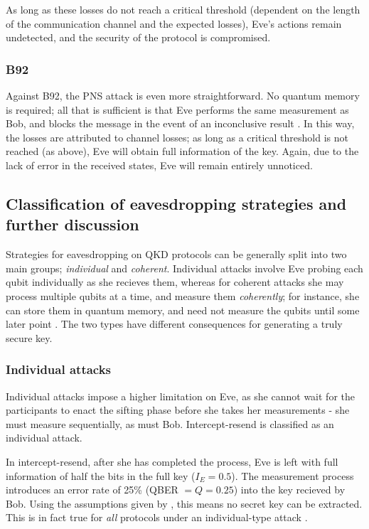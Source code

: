 \documentclass[paper=a4, fontsize=11pt]{scrartcl} %
\numberwithin{equation}{section} %
\numberwithin{figure}{section} %
\numberwithin{table}{section} %
\begin{document}
As long as these losses do not reach a critical threshold (dependent on the length of the communication channel and the expected losses),
Eve's actions remain undetected, and the security of the protocol is compromised.


\subsubsection{B92}
Against B92, the PNS attack is even more straightforward. No quantum memory is required; all that is sufficient is that Eve performs
the same measurement as Bob, and blocks the message in the event of an inconclusive result \citep{kronberg2009}. In this way, the losses are attributed
to channel losses; as long as a critical threshold is not reached (as above), Eve will obtain full information of the key. Again, due to
the lack of error in the received states, Eve will remain entirely unnoticed.

\subsection{Classification of eavesdropping strategies and further discussion}
Strategies for eavesdropping on QKD protocols can be generally split into two main groups;
\textit{individual} and \textit{coherent}. Individual attacks involve
Eve probing each qubit individually as she recieves them, whereas for coherent attacks
she may process multiple qubits at a time, and measure them \textit{coherently}; for
instance, she can store them in quantum memory, and need not measure the qubits until
some later point \citep{gisin2002}. The two types have different consequences for generating
a truly secure key.

\subsubsection{Individual attacks}
Individual attacks impose a higher limitation on Eve, as she cannot wait for the participants to enact the sifting
phase before she takes her measurements - she must measure sequentially, as must Bob. Intercept-resend is classified as an individual attack.

In intercept-resend, after she has completed the process,
Eve is left with full information of half the bits in the full key ($I_E = 0.5$).
The measurement process introduces an error rate of 25\% (QBER $= Q = 0.25$)
into the key recieved by Bob. Using the assumptions given by \citet{csiszarAssump},
this means no secret key can be extracted. This is in fact true for \textit{all} protocols under an individual-type
attack \citep{reviewScariani}.
\end{document}
